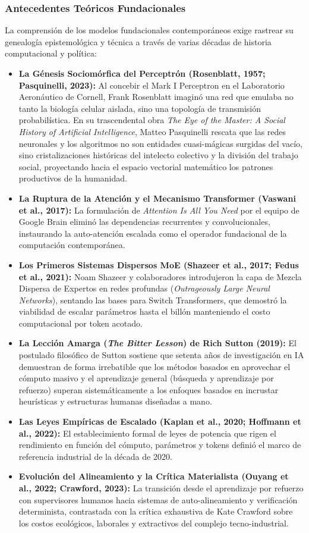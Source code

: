 \subsubsection*{Antecedentes Teóricos Fundacionales}
La comprensión de los modelos fundacionales contemporáneos exige rastrear su genealogía epistemológica y técnica a través de varias décadas de historia computacional y política:
\begin{itemize}[leftmargin=1.5em, itemsep=0.25em]
    \item \textbf{La Génesis Sociomórfica del Perceptrón (Rosenblatt, 1957; Pasquinelli, 2023):} Al concebir el Mark I Perceptron en el Laboratorio Aeronáutico de Cornell, Frank Rosenblatt imaginó una red que emulaba no tanto la biología celular aislada, sino una topología de transmisión probabilística. En su trascendental obra \textit{The Eye of the Master: A Social History of Artificial Intelligence}, Matteo Pasquinelli rescata que las redes neuronales y los algoritmos no son entidades cuasi-mágicas surgidas del vacío, sino cristalizaciones históricas del intelecto colectivo y la división del trabajo social, proyectando hacia el espacio vectorial matemático los patrones productivos de la humanidad.
    \item \textbf{La Ruptura de la Atención y el Mecanismo Transformer (Vaswani et al., 2017):} La formulación de \textit{Attention Is All You Need} por el equipo de Google Brain eliminó las dependencias recurrentes y convolucionales, instaurando la auto-atención escalada como el operador fundacional de la computación contemporánea.
    \item \textbf{Los Primeros Sistemas Dispersos MoE (Shazeer et al., 2017; Fedus et al., 2021):} Noam Shazeer y colaboradores introdujeron la capa de Mezcla Dispersa de Expertos en redes profundas (\textit{Outrageously Large Neural Networks}), sentando las bases para Switch Transformers, que demostró la viabilidad de escalar parámetros hasta el billón manteniendo el costo computacional por token acotado.
    \item \textbf{La Lección Amarga (\textit{The Bitter Lesson}) de Rich Sutton (2019):} El postulado filosófico de Sutton sostiene que setenta años de investigación en IA demuestran de forma irrebatible que los métodos basados en aprovechar el cómputo masivo y el aprendizaje general (búsqueda y aprendizaje por refuerzo) superan sistemáticamente a los enfoques basados en incrustar heurísticas y estructuras humanas diseñadas a mano.
    \item \textbf{Las Leyes Empíricas de Escalado (Kaplan et al., 2020; Hoffmann et al., 2022):} El establecimiento formal de leyes de potencia que rigen el rendimiento en función del cómputo, parámetros y tokens definió el marco de referencia industrial de la década de 2020.
    \item \textbf{Evolución del Alineamiento y la Crítica Materialista (Ouyang et al., 2022; Crawford, 2023):} La transición desde el aprendizaje por refuerzo con supervisores humanos hacia sistemas de auto-alineamiento y verificación determinista, contrastada con la crítica exhaustiva de Kate Crawford sobre los costos ecológicos, laborales y extractivos del complejo tecno-industrial.
\end{itemize}
\newpage

